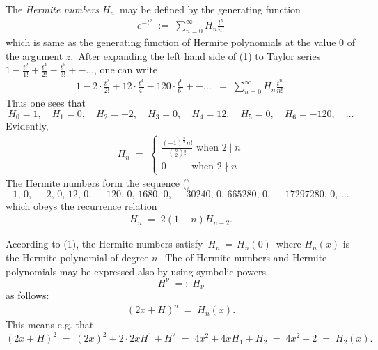 \documentclass[12pt]{article}
\theoremstyle{definition}
\begin{document}
The \emph{Hermite numbers} $H_n$\, may be defined by the generating function
\begin{align}
e^{-t^2} \;:=\; \sum_{n=0}^\infty H_n\frac{t^n}{n!}
\end{align}
which is same as the generating function of Hermite polynomials at the value 0 of the argument $z$.\, After expanding the left hand side of (1) to Taylor series $1-\frac{t^2}{1!}+\frac{t^4}{2!}-\frac{t^6}{3!}+-\ldots$, one can write
\begin{align}
1-2\!\cdot\!\frac{t^2}{2!}+12\!\cdot\!\frac{t^4}{4!}-120\!\cdot\!\frac{t^6}{6!}+-\ldots \;\;=\; \sum_{n=0}^\infty H_n\frac{t^n}{n!}.
\end{align}
Thus one sees that
$$H_0 = 1,\quad H_1 = 0,\quad H_2 = -2,\quad H_3 = 0,\quad H_4 = 12,\quad H_5 = 0,\quad H_6 = -120,\quad\ldots$$
Evidently,
\begin{align}
H_n \;=\; 
\begin{cases}
\frac{(-1)^{\frac{n}{2}}n!}{(\frac{n}{2})!} \textrm{  when  } 2 \mid n\\
0\; \qquad \textrm{ when  } 2 \nmid n 
\end{cases}
\end{align}
The Hermite numbers form the sequence ()
$$1,\,0,\,-2,\,0,\,12,\,0,\,-120,\,0,\,1680,\,0,\,-30240,\,0,\,665280,\,0,\,-17297280,\,0,\,\ldots$$
which obeys the recurrence relation
\begin{align}
H_n \;=\; 2(1\!-\!n)H_{n-2}.
\end{align}

According to (1), the Hermite numbers satisfy\, $H_n \,=\, H_n(0)$\, where $H_n(x)$ is the Hermite polynomial of degree $n$.\, The  of Hermite numbers and Hermite polynomials may be expressed also by using symbolic powers
$$H^\nu \;=:\; H_\nu$$
as follows:
\begin{align}
(2x+H)^n \;=\; H_n(x).
\end{align}
This means e.g. that
$$(2x+H)^2 \;=\; (2x)^2+2\cdot2xH^1+H^2 \;=\; 4x^2+4xH_1+H_2 \;=\; 4x^2-2 \;=\; H_2(x).$$

\end{document}
